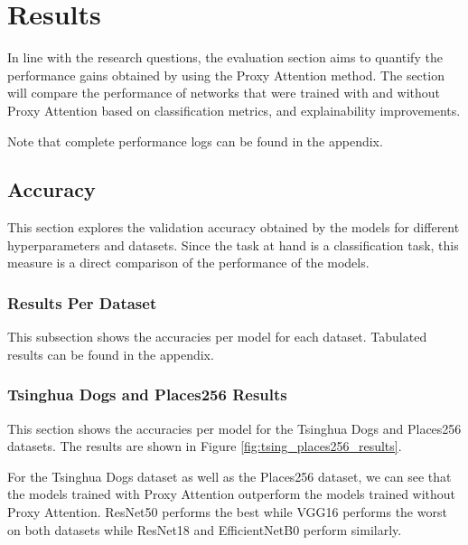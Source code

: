 \documentclass[a4paper,11pt,openright]{book}
\begin{document}
\chapter{Results} \label{ch:results}
In line with the research questions, the evaluation section aims to quantify the performance gains obtained by using the Proxy Attention method. The section will compare the performance of networks that were trained with and without Proxy Attention based on classification metrics, and explainability improvements.

Note that complete performance logs can be found in the appendix.
\section{Accuracy}
This section explores the validation accuracy obtained by the models for different hyperparameters and datasets. Since the task at hand is a classification task, this measure is a direct comparison of the performance of the models.

\subsection{Results Per Dataset}
This subsection shows the accuracies per model for each dataset. Tabulated results can be found in the appendix.

\subsection{Tsinghua Dogs and Places256 Results}
This section shows the accuracies per model for the Tsinghua Dogs \cite{zouNewDatasetDog2020} and Places256 \cite{zhouPlaces10Million2018} datasets. The results are shown in Figure \ref{fig:tsing_places256_results}.

For the Tsinghua Dogs dataset as well as the Places256 dataset, we can see that the models trained with Proxy Attention outperform the models trained without Proxy Attention. 
ResNet50 performs the best while VGG16 performs the worst on both datasets while ResNet18 and EfficientNetB0 perform similarly. 
\end{document}
